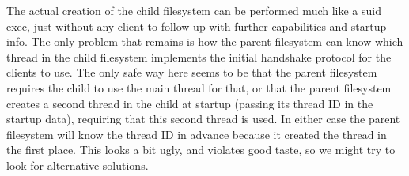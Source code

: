 \begin{comment}
  There is a race here.  If the child filesystem dies and the parent
  filesystem processes the task death notification and releases the
  task info cap for the child before the user acquires its own task
  info cap for the child, then an imposter might be able to pretend to
  be the child filesystem for the client.
  
  This race can only be avoided by a more complex protocol:
  
  Variant 1: The user has to acquire the task info cap for the child
  fs, and then it has to perform the lookup again.  If then the thread
  ID is for the task it got the task ID for in advance, it can go on.
  If not, it has to retry.  This is not so good because a directory
  lookup is usually an expensive operation.  However, it has the
  advantage of only slowing down the rare case.
  
  Variant 2: The client creates an empty reference container in the
  task server, which can then be used by the server to fill in a
  reference to the child's task ID.  However, the client has to create
  and destroy such a container for every filesystem where it excepts
  it could be redirected to another (that means: for all filesystems
  for which it does not use \verb/O_NOTRANS/).  This is quite an
  overhead to the common case.

\begin{verbatim}
<marcus> I have another idea
<marcus> the client does not give a container
<marcus> server sees child fs, no container -> returns O_NOTRANS node
<marcus> then client sees error, uses O_NOTRANS node, "" and container
<marcus> problem solved
<marcus> this seems to be the optimum
<neal> hmm.
<neal> So lazily supply a container.
<marcus> yeah
<neal> Hoping you won't need one.
<marcus> and the server helps you by doing as much as it can usefully
<neal> And that is the normal case.
<neal> Yeah, that seems reasonable.
<marcus> the trick is that the server won't fail completely
<marcus> it will give you at least the underlying node
\end{verbatim}
\end{comment}

The actual creation of the child filesystem can be performed much like
a suid exec, just without any client to follow up with further
capabilities and startup info.  The only problem that remains is how
the parent filesystem can know which thread in the child filesystem
implements the initial handshake protocol for the clients to use.  The
only safe way here seems to be that the parent filesystem requires the
child to use the main thread for that, or that the parent filesystem
creates a second thread in the child at startup (passing its thread ID
in the startup data), requiring that this second thread is used.  In
either case the parent filesystem will know the thread ID in advance
because it created the thread in the first place.  This looks a bit
ugly, and violates good taste, so we might try to look for alternative
solutions.


